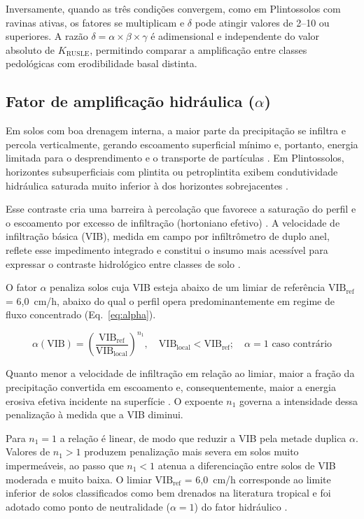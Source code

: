 \documentclass[preprint,review,12pt,authoryear]{elsarticle}
\begin{document}
Inversamente, quando as três condições convergem, como em Plintossolos com ravinas ativas, os fatores se multiplicam e $\delta$ pode atingir valores de 2--10 ou superiores. A razão $\delta = \alpha \times \beta \times \gamma$ é adimensional e independente do valor absoluto de $K_{\mathrm{RUSLE}}$, permitindo comparar a amplificação entre classes pedológicas com erodibilidade basal distinta.

\subsection{Fator de amplificação hidráulica ($\alpha$)}

Em solos com boa drenagem interna, a maior parte da precipitação se infiltra e percola verticalmente, gerando escoamento superficial mínimo e, portanto, energia limitada para o desprendimento e o transporte de partículas \citep{deroo_1992}. Em Plintossolos, horizontes subsuperficiais com plintita ou petroplintita exibem condutividade hidráulica saturada muito inferior à dos horizontes sobrejacentes \citep{de_moraes_et_al_2006}.

Esse contraste cria uma barreira à percolação que favorece a saturação do perfil e o escoamento por excesso de infiltração (hortoniano efetivo) \citep{padmanabhan_2005}. A velocidade de infiltração básica (VIB), medida em campo por infiltrômetro de duplo anel, reflete esse impedimento integrado e constitui o insumo mais acessível para expressar o contraste hidrológico entre classes de solo \citep{bertoni_lombardi_neto_2017}.

O fator $\alpha$ penaliza solos cuja VIB esteja abaixo de um limiar de referência $\mathrm{VIB_{ref}}$ = 6,0~cm/h, abaixo do qual o perfil opera predominantemente em regime de fluxo concentrado (Eq.~\ref{eq:alpha}).

\begin{equation}
\alpha(\mathrm{VIB}) = \left(\frac{\mathrm{VIB_{ref}}}{\mathrm{VIB_{local}}}\right)^{n_1}, \quad \mathrm{VIB_{local}} < \mathrm{VIB_{ref}}; \quad \alpha = 1 \text{ caso contrário}
\label{eq:alpha}
\end{equation}

Quanto menor a velocidade de infiltração em relação ao limiar, maior a fração da precipitação convertida em escoamento e, consequentemente, maior a energia erosiva efetiva incidente na superfície \citep{kinnell_2005}. O expoente $n_1$ governa a intensidade dessa penalização à medida que a VIB diminui. 

Para $n_1 = 1$ a relação é linear, de modo que reduzir a VIB pela metade duplica $\alpha$. Valores de $n_1 > 1$ produzem penalização mais severa em solos muito impermeáveis, ao passo que $n_1 < 1$ atenua a diferenciação entre solos de VIB moderada e muito baixa. O limiar $\mathrm{VIB_{ref}}$ = 6,0~cm/h corresponde ao limite inferior de solos classificados como bem drenados na literatura tropical e foi adotado como ponto de neutralidade ($\alpha = 1$) do fator hidráulico \citep{embrapa_2018}.
\end{document}
